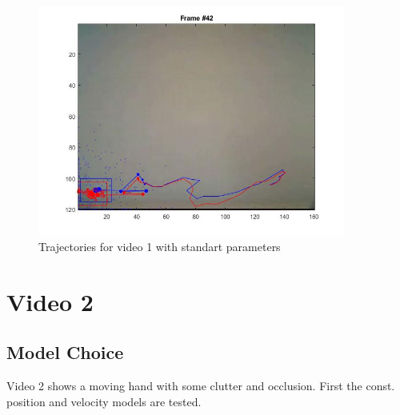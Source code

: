 \documentclass[12pt]{article}
\begin{document}
\vspace{5mm}
\begin{figure}[H]
	\centering
	\includegraphics[width=0.9\textwidth]{1.jpg}
	\caption{Trajectories for video 1 with standart parameters}
	\label{fig1}
\end{figure}
\vspace{5mm}

\section{Video 2}

\subsection{Model Choice}
Video 2 shows a moving hand with some clutter and occlusion. First the const. position and velocity models are tested. 
\end{document}

